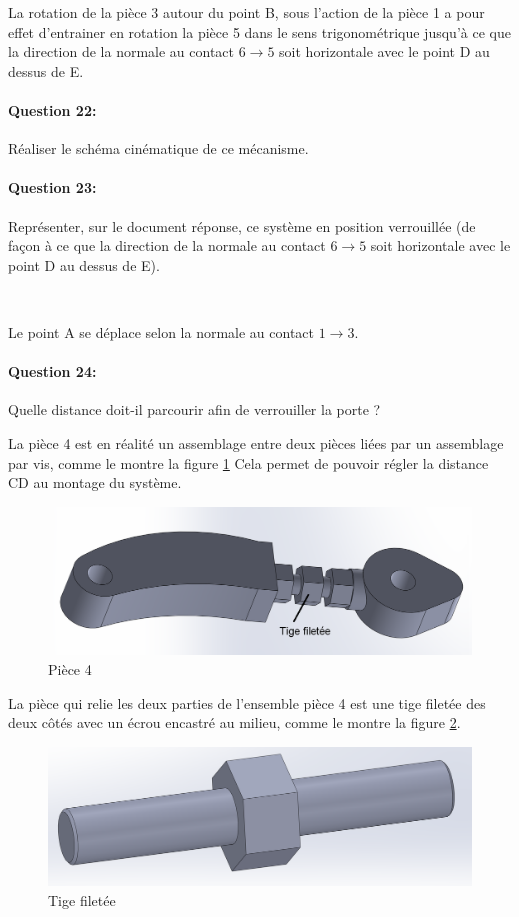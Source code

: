 La rotation de la pièce 3 autour du point B, sous l'action de la pièce 1 a pour effet d'entrainer en rotation la pièce 5 dans le sens trigonométrique jusqu'à ce que la direction de la normale au contact $6\rightarrow 5$ soit horizontale avec le point D au dessus de E.

\paragraph{Question 22:} Réaliser le schéma cinématique de ce mécanisme.

\paragraph{Question 23:} Représenter, sur le document réponse, ce système en position verrouillée (de façon à ce que la direction de la normale au contact $6\rightarrow 5$ soit horizontale avec le point D au dessus de E).

~\

Le point A se déplace selon la normale au contact $1\rightarrow 3$.

\paragraph{Question 24:} Quelle distance doit-il parcourir afin de verrouiller la porte ?

La pièce 4 est en réalité un assemblage entre deux pièces liées par un assemblage par vis, comme le montre la figure \ref{fig14} Cela permet de pouvoir régler la distance CD au montage du système.

\begin{figure}[!h]
 \centering\includegraphics[width=0.7\linewidth]{img/assemblage}
 \caption{Pièce 4}
 \label{fig14}
\end{figure}

La pièce qui relie les deux parties de l'ensemble pièce 4 est une tige filetée des deux côtés avec un écrou encastré au milieu, comme le montre la figure \ref{fig15}.

\begin{figure}[!h]
 \centering\includegraphics[width=0.6\linewidth]{img/vis}
 \caption{Tige filetée}
 \label{fig15}
\end{figure}

